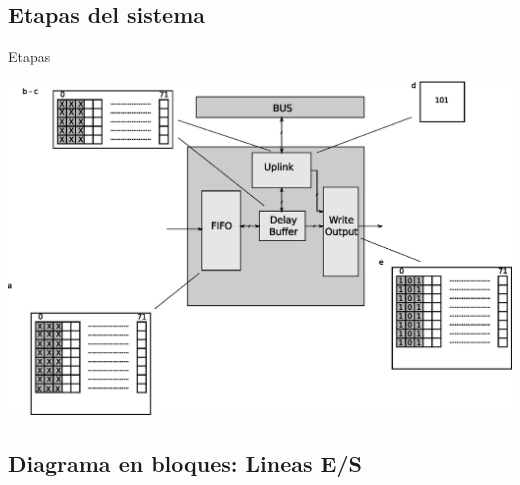 \documentclass[xcolor=dvipsnames]{beamer}
\begin{document}
\subsection{Etapas del sistema}
\begin{frame}{Etapas}

\center 
\includegraphics[scale=0.35]{figures/moduloexp.eps}

\end{frame}

\subsection{Diagrama en bloques: Lineas E/S}
\end{document}
